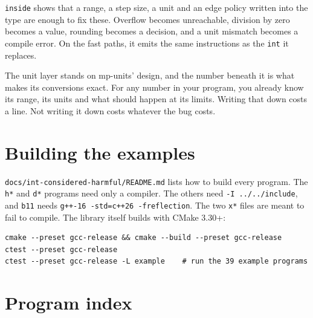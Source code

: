 \documentclass[11pt,a4paper]{article}
\newcommand{\code}[1]{\texttt{\small #1}}
\newcommand{\file}[1]{\texttt{\small #1}}
\begin{document}
\code{inside} shows that a range, a step size, a unit and an edge policy
written into the type are enough to fix these. Overflow becomes unreachable, division by
zero becomes a value, rounding becomes a decision, and a unit mismatch becomes
a compile error. On the fast paths, it emits the same instructions as the
\code{int} it replaces.

The unit layer stands on mp-units' design, and the number beneath it is what
makes its conversions exact. For any number in your program, you already know
its range, its units and what should happen at its limits. Writing that down costs a line. Not writing it
down costs whatever the bug costs.

\appendix
\section{Building the examples}

\file{docs/int-considered-harmful/README.md} lists how to build every program.
The \code{h*} and \code{d*} programs need only a compiler. The others need
\code{-I ../../include}, and \code{b11} needs \code{g++-16 -std=c++26
-freflection}. The two \code{x*} files are meant to fail to compile. The
library itself builds with CMake 3.30+:

\begin{lstlisting}[style=term]
cmake --preset gcc-release && cmake --build --preset gcc-release
ctest --preset gcc-release
ctest --preset gcc-release -L example    # run the 39 example programs
\end{lstlisting}

\section{Program index}
\end{document}
